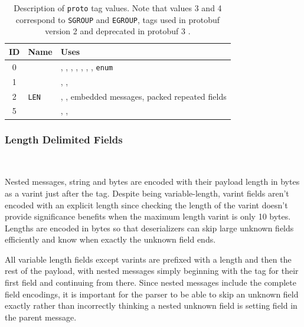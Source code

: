 \begin{table}[H]
	\centering
	\begin{tabular}{cll}
		\toprule
		ID & Name            & Uses                                                 \\
		\midrule
		0  & \wtvar & \ints, \intl, \uints,
		\uintl, \sints, \sintl,
		\bool, \texttt{enum}                                                \\
		1  & \wtil    & \fixedl, \sfixedl, \double \\
		2  & \texttt{LEN}    & \String, \byt, embedded messages,
		packed repeated fields                                                      \\
		5  & \wtis    & \fixeds, \sfixeds,
		\float                                                              \\
		\bottomrule
	\end{tabular}

	\vspace{4mm}
	\caption[]{Description of \texttt{proto} tag values. Note that values 3 and
		4 correspond to \texttt{SGROUP} and \texttt{EGROUP}, tags used in protobuf
		version 2 and deprecated in protobuf 3 \autocite{Encoding}.}\label{tab:tags}
\end{table}

\subsubsection{Length Delimited Fields}~\label{sec:proto-len}

Nested messages, string and bytes are encoded with their payload length in bytes
as a varint just after the tag. Despite being variable-length, varint fields
aren't encoded with an explicit length since checking the length of the varint
doesn't provide significance benefits when the maximum length varint is only 10
bytes. Lengths are encoded in bytes so that deserializers can skip large unknown
fields efficiently and know when exactly the unknown field ends.

All variable length fields except varints are prefixed with a length and then
the rest of the payload, with nested messages simply beginning with the tag for
their first field and continuing from there. Since nested messages include the
complete field encodings, it is important for the parser to be able to skip an
unknown field exactly rather than incorrectly thinking a nested unknown field is
setting field in the parent message.

